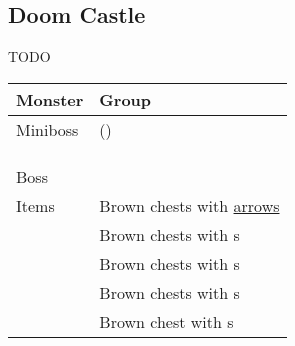 \subsection{Doom Castle}
\label{map:doom_castle}

TODO


\noindent\begin{tabularx}{\textwidth}[l]{lX}
	Monster & Group
\\ \hline
	Miniboss
	& (\nameref{monster:skullrus_rex}) \\
	& \nameref{monster:stone_golem} \\
	& \nameref{monster:twinhead_wyvern} \\
	& \nameref{monster:zuh}
\\ \hline
	Boss & \nameref{monster:dark_king}
\\ \hline
	Items
	& Brown chests with \hyperref[weapon:bow_of_grace]{arrows} \\
	& Brown chests with \nameref{item:cure_potion}s \\
	& Brown chests with \nameref{item:heal_potion}s \\
	& Brown chests with \nameref{item:seed}s \\
	& Brown chest with \nameref{item:refresher}s \\
\end{tabularx}
